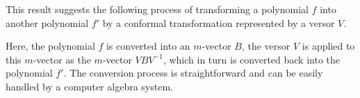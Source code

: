 \documentclass{ecgd-l}
\theoremstyle{definition}
\theoremstyle{remark}
\numberwithin{equation}{section}
\begin{document}
This result suggests the following process of transforming a polynomial $f$ into another polynomial $f'$ by a conformal
transformation represented by a versor $V$.
\begin{center}
\end{center}
Here, the polynomial $f$ is converted into an $m$-vector $B$, the versor $V$ is applied to this $m$-vector
as the $m$-vector $VBV^{-1}$, which in turn is converted back into the polynomial $f'$.  The conversion
process is straightforward and can be easily handled by a computer algebra system.




\end{document}
